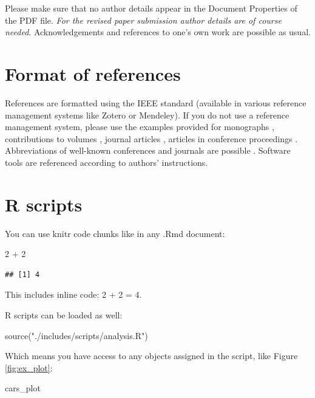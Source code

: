 \documentclass[
  a4paper,
  11pt,
  twocolumn]{article}
\newenvironment{Shaded}{\begin{snugshade}}{\end{snugshade}}
\newcommand{\DecValTok}[1]{\textcolor[rgb]{0.86,0.86,0.80}{#1}}
\newcommand{\FunctionTok}[1]{\textcolor[rgb]{0.94,0.94,0.56}{#1}}
\newcommand{\NormalTok}[1]{\textcolor[rgb]{0.80,0.80,0.80}{#1}}
\newcommand{\SpecialCharTok}[1]{\textcolor[rgb]{0.86,0.64,0.64}{#1}}
\newcommand{\StringTok}[1]{\textcolor[rgb]{0.80,0.58,0.58}{#1}}
\begin{document}
Please make sure that no author details appear in the Document
Properties of the PDF file.
\emph{For the revised paper submission author details are of course needed}.
Acknowledgements and references to one's own work are possible as usual.

\section{Format of references}

References are formatted using the IEEE standard (available in various
reference management systems like Zotero or Mendeley). If you do not use
a reference management system, please use the examples provided for
monographs \cite{Fant:1960}, contributions to volumes
\cite{Stevens:1999}, journal articles \cite{Beattie/etal:1982}, articles
in conference proceedings \cite{Ladefoged:2003}. Abbreviations of
well-known conferences and journals are possible
\cite{Peterson/Barney:1952}. Software tools \cite{Boril/Skarnitzl:2016}
are referenced according to authors' instructions.

\section{R scripts}

You can use knitr code chunks like in any .Rmd document:

\begin{Shaded}
\begin{Highlighting}[]
\DecValTok{2} \SpecialCharTok{+} \DecValTok{2}
\end{Highlighting}
\end{Shaded}

\begin{verbatim}
## [1] 4
\end{verbatim}

This includes inline code: 2 + 2 = 4.

R scripts can be loaded as well:

\begin{Shaded}
\begin{Highlighting}[]
\FunctionTok{source}\NormalTok{(}\StringTok{"./includes/scripts/analysis.R"}\NormalTok{)}
\end{Highlighting}
\end{Shaded}

Which means you have access to any objects assigned in the script, like
Figure \ref{fig:ex_plot}:

\begin{Shaded}
\begin{Highlighting}[]
\NormalTok{cars\_plot}
\end{Highlighting}
\end{Shaded}
\end{document}
